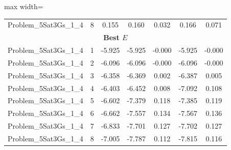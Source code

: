 \begin{table}[!htbp]
\begin{adjustbox}{max width=\columnwidth}
\begin{tabularx}{\columnwidth}{c|c c c c c c}
            Problem\_5Sat3Gs\_1\_4 & 8 & 0.155 & 0.160 & 0.032 & 0.166 & 0.071 \\
            \multicolumn{7}{c}{\textbf{Best $E$}} \\ \midrule
            Problem\_5Sat3Gs\_1\_4 & 1 & -5.925 & -5.925 & -0.000 & -5.925 & -0.000 \\
            Problem\_5Sat3Gs\_1\_4 & 2 & -6.096 & -6.096 & -0.000 & -6.096 & -0.000 \\
            Problem\_5Sat3Gs\_1\_4 & 3 & -6.358 & -6.369 & 0.002 & -6.387 & 0.005 \\
            Problem\_5Sat3Gs\_1\_4 & 4 & -6.403 & -6.452 & 0.008 & -7.092 & 0.108 \\
            Problem\_5Sat3Gs\_1\_4 & 5 & -6.602 & -7.379 & 0.118 & -7.385 & 0.119 \\
            Problem\_5Sat3Gs\_1\_4 & 6 & -6.662 & -7.557 & 0.134 & -7.567 & 0.136 \\
            Problem\_5Sat3Gs\_1\_4 & 7 & -6.833 & -7.701 & 0.127 & -7.702 & 0.127 \\
            Problem\_5Sat3Gs\_1\_4 & 8 & -7.005 & -7.787 & 0.112 & -7.815 & 0.116 \\
            \bottomrule
        \end{tabularx}
    \end{adjustbox}
\end{table}

